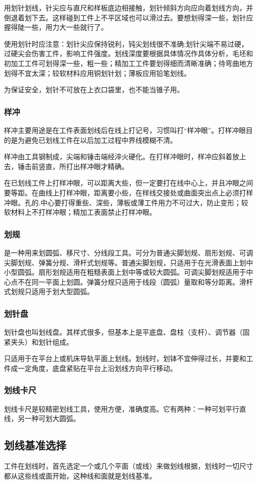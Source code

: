 \documentclass{ctexbook}
\begin{document}
用划针划线，针尖应与直尺和样板底边相接触，划针倾斜方向应向着划线方向，并倒退着划下去。这样碰到工件上不平区域也可以滑过去。要想划得深一些，划针应握得陡一些，用力大一些就行了。

使用划针时应注意：划针尖应保持锐利，钝尖划线很不准确;划针尖端不易过硬，过硬尖会伤害工件，影响工件强度。划线深度要根据具体情况作具体分析，毛坯和初加工工件可划得深一些，粗一些；精加工工件要划得细而清晰准确；待弯曲地方划得不宜太深；较软材料应用铜划针划；薄板应用铅笔划线。

为保证安全，划针不可放在上衣口袋里，也不能当锥子用。
\subsubsection{样冲}
样冲主要用途是在工件表面划线后在线上打记号，习惯叫打“样冲眼”。打样冲眼目的是为避免已划线工件在以后加工过程中界线模糊不清。

样冲由工具钢制成，尖端和锤击端经淬火硬化。在打样冲眼时，样冲应斜着放上去，锤击前竖直，所打出样冲眼才精确。

在已划线工件上打样冲眼，可以距离大些，但一定要打在线中心上，并且冲眼之间要等距。在曲线上打样冲眼，距离要小些，在样线交接处或曲面突出点上必须打样冲眼。孔的.中心要打得重些、深些，薄板或薄工件用力不可过大，防止变形；较软材料上不打样冲眼；精加工表面禁止打样冲眼。
\subsubsection{划规}
是一种用来划圆弧、移尺寸、分线段工具。可分为普通尖脚划规、扇形划规、可调尖脚划规、弹簧分规、滑杆式划规等。普通尖脚划规，只适用于在光滑表面上划中小型圆弧。扇形划规适用在粗糙表面上划中等或较大圆弧。可调尖脚划规适用于中心点不在同一平面上划圆。弹簧分规只适用于线段（圆弧）量取和等分距离。滑杆式划规只适用于划大型圆弧。
\subsubsection{划针盘}
划针盘也叫划线盘。其样式很多，但基本上是平底盘、盘柱（支杆）、调节器（固紧夹头）和划针组成。

只适用于在平台上或机床导轨平面上划线。划线时，划钵不宜伸得过长，并要和工件成一定角度，底盘紧贴在平台上沿划线方向平行移动。
\subsubsection{划线卡尺}
划线卡尺是较精密划线工具，使用方便，准确度高。它有两种：一种可划平行直线，另一种可划大圆弧。
\subsection{划线基准选择}
工件在划线时，首先选定一个或几个平面（或线）来做划线根据，划线时一切尺寸都从这些线或面开始，这种线和面就是划线基准。
\end{document}
